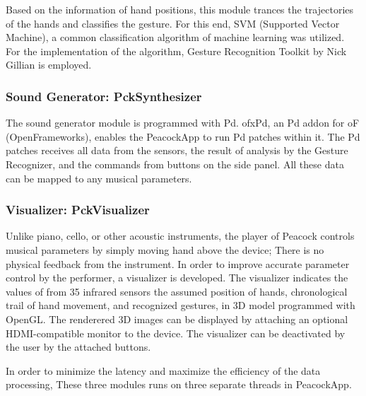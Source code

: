 \documentclass{nime-alternate}
\begin{document}
Based on the information of hand positions, this module trances the trajectories of the hands and classifies the gesture. For this end,  SVM (Supported Vector Machine), a common classification algorithm of machine learning was utilized. For the implementation of the algorithm, Gesture Recognition Toolkit by Nick Gillian is employed.

\subsubsection{Sound Generator: PckSynthesizer}

The sound generator module is programmed with Pd\cite{Pd}. ofxPd\cite{ofxPd}, an Pd addon for oF\\(OpenFrameworks), enables the PeacockApp to run Pd patches within it. The Pd patches receives all data from the sensors, the result of analysis by the Gesture Recognizer, and the commands from buttons on the side panel. All these data can be mapped to any musical parameters.
 
\subsubsection{Visualizer: PckVisualizer}

Unlike piano, cello, or other acoustic instruments, the player of Peacock controls musical parameters by simply moving hand above the device; There is no physical feedback from the instrument. In order to improve accurate parameter control by the performer, a visualizer is developed.  The visualizer indicates the values of from 35 infrared sensors  the assumed position of hands, chronological trail of hand movement, and recognized gestures, in  3D model programmed with OpenGL\cite{OpenGL}. The renderered 3D images can be displayed by attaching an optional HDMI-compatible monitor to the device.
The visualizer can be deactivated by the user by the attached buttons.

In order to minimize the latency and maximize the efficiency of the data processing, These three modules runs on three separate threads in PeacockApp. 
\end{document}
